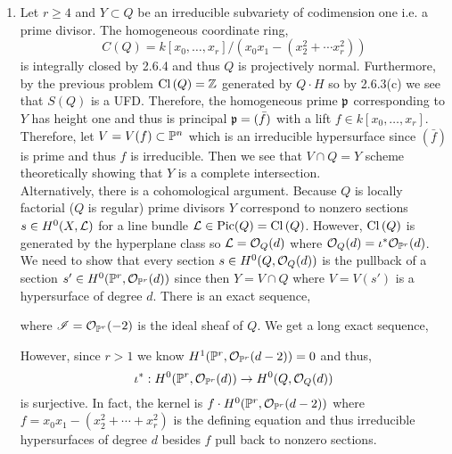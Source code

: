\documentclass[12pt]{article}
\begin{document}
\begin{enumerate}
\item Let $r \ge 4$ and $Y \subset Q$ be an irreducible subvariety of codimension one i.e. a prime divisor. The homogeneous coordinate ring,
\[ C(Q) = k[x_0, \dots, x_r]/(x_0 x_1 - (x_2^2 + \cdots x_r^2)) \]
is integrally closed by 2.6.4 and thus $Q$ is projectively normal. Furthermore, by the previous problem $\Cl{Q} = \Z$ generated by $Q \cdot H$ so by 2.6.3(c) we see that $S(Q)$ is a UFD. Therefore, the homogeneous prime $\p$ corresponding to $Y$ has height one and thus is principal $\p = (\bar{f})$ with a lift $f \in k[x_0, \dots, x_r]$. Therefore, let $V = V(f) \subset \P^n$ which is an irreducible hypersurface since $(\bar{f})$ is prime and thus $f$ is irreducible. Then we see that $V \cap Q = Y$ scheme theoretically showing that $Y$ is a complete intersection.
\bigskip\\
Alternatively, there is a cohomological argument. Because $Q$ is locally factorial ($Q$ is regular) prime divisors $Y$ correspond to nonzero sections $s \in H^0(X, \L)$ for a line bundle $\L \in \Pic{Q} = \Cl{Q}$. However, $\Cl{Q}$ is generated by the hyperplane class so $\L = \struct{Q}(d)$ where $\struct{Q}(d) = \iota^* \struct{\P^r}(d)$. We need to show that every section $s \in H^0(Q, \struct{Q}(d))$ is the pullback of a section $s' \in H^0(\P^r, \struct{\P^r}(d))$ since then $Y = V \cap Q$ where $V = V(s')$ is a hypersurface of degree $d$. There is an exact sequence,
\begin{center}
\end{center}
where $\I = \struct{\P^r}(-2)$ is the ideal sheaf of $Q$. We get a long exact sequence,
\begin{center}
\end{center}
However, since $r > 1$ we know $H^1(\P^r, \struct{\P^r}(d-2)) = 0$ and thus,
\[ \iota^* : H^0(\P^r, \struct{\P^r}(d)) \to H^0(Q, \struct{Q}(d)) \]
is surjective. In fact, the kernel is $f \cdot H^0(\P^r, \struct{\P^r}(d-2))$ where $f = x_0 x_1 - (x_2^2 + \cdots + x_r^2)$ is the defining equation and thus irreducible hypersurfaces of degree $d$ besides $f$ pull back to nonzero sections.
\end{enumerate}
\end{document}
